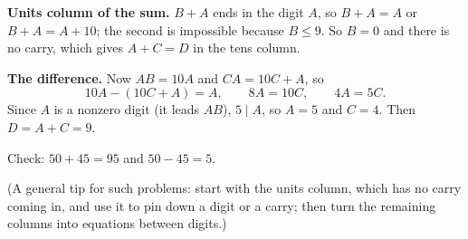 \textbf{Units column of the sum.} $B+A$ ends in the digit $A$, so $B+A=A$ or $B+A=A+10$; the second is impossible because $B\le9$. So $B=0$ and there is no carry, which gives $A+C=D$ in the tens column.

\textbf{The difference.} Now $AB=10A$ and $CA=10C+A$, so
\[10A-(10C+A)=A,\qquad 8A=10C,\qquad 4A=5C .\]
Since $A$ is a nonzero digit (it leads $AB$), $5\mid A$, so $A=5$ and $C=4$. Then $D=A+C=\boxed{9}$.

Check: $50+45=95$ and $50-45=5$.

(A general tip for such problems: start with the units column, which has no carry coming in, and use it to pin down a digit or a carry; then turn the remaining columns into equations between digits.)
